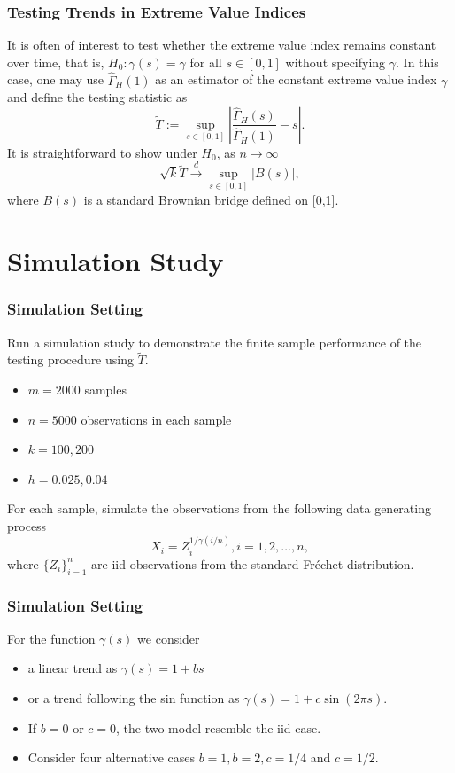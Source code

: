 \documentclass{beamer}
\begin{document}
\begin{frame}
    \frametitle{Testing Trends in Extreme Value Indices}
    It is often of interest to test whether the extreme value index remains constant over time, that is, $H_0 :\gamma(s)=\gamma$ for all $s \in [0,1]$ without specifying $\gamma$. In this case, one may use $\hat{\Gamma}_H(1)$  as an estimator of the constant extreme value index $\gamma$ and define the testing statistic as
    $$
    \tilde{T}:=\sup _{s \in[0,1]}\left|\frac{\hat{\Gamma}_{H}(s)}{\hat{\Gamma}_{H}(1)}-s\right|.
    $$
    It is straightforward to show under $H_0$, as $n \to \infty$
    $$
    \sqrt{k} \tilde{T} \stackrel{d}{\rightarrow} \sup _{s \in[0,1]}|B(s)|,
    $$
    where $B(s)$ is a standard Brownian bridge defined on [0,1].
\end{frame}


\section{Simulation Study}

\begin{frame}
    \frametitle{Simulation Setting}
Run a simulation study to demonstrate the finite sample performance of the testing procedure using $\tilde{T}$.

\begin{itemize}
    \item $m=2000$ samples
    \item  $n=5000$ observations in each sample
    \item  $k=100,200$
    \item  $h=0.025,0.04$
\end{itemize}
  
    
    For each sample,  simulate the observations from the following data generating process
    $$
    X_i=Z_i^{1/\gamma(i/n)}, i=1,2,\dots,n,
    $$
    where $\{Z_i\}_{i=1}^n$ are iid observations from the standard Fr\'echet distribution.
\end{frame}

\begin{frame}
    \frametitle{Simulation Setting}
    For the function $\gamma(s)$ we consider 
    \begin{itemize}
        \item  a linear trend as $\gamma(s)=1+bs$
        \medskip
        \item  or a trend following the sin function as $\gamma(s)=1+c\sin(2\pi s)$.
    \end{itemize}

    \bigskip

    \begin{itemize}
        \item 
        If $b=0$ or $c=0$, the two model resemble the iid case.
        \medskip
        \item     
        Consider four alternative cases $b=1, b=2, c=1/4$ and $c=1/2$.
    \end{itemize}
\end{frame}
\end{document}
